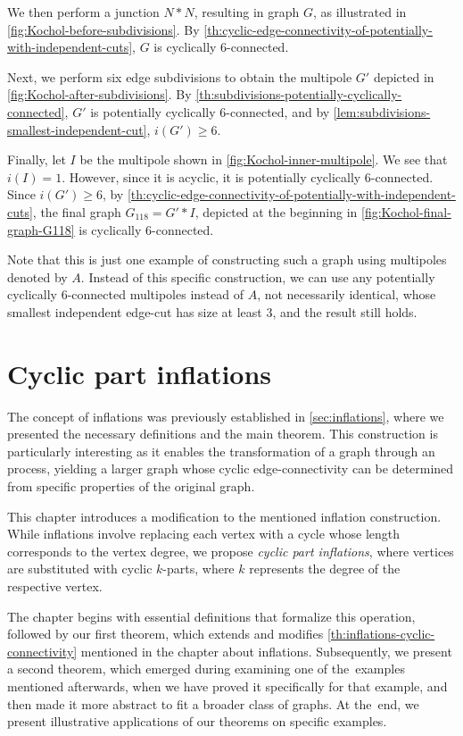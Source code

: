 \documentclass[12pt, twoside]{book}
\begin{document}
\begin{example}
	We then perform a junction $N*N$, resulting in graph $G$, as illustrated in \cref{fig:Kochol-before-subdivisions}. By \cref{th:cyclic-edge-connectivity-of-potentially-with-independent-cuts}, $G$ is cyclically 6-connected.
	
	Next, we perform six edge subdivisions to obtain the multipole $G'$ depicted in \cref{fig:Kochol-after-subdivisions}. By \cref{th:subdivisions-potentially-cyclically-connected}, $G'$ is potentially cyclically 6-connected, and by \cref{lem:subdivisions-smallest-independent-cut}, $i(G')\geq 6$.
	
	Finally, let $I$ be the multipole shown in \cref{fig:Kochol-inner-multipole}. We see that $i(I)=1$. However, since it is acyclic, it is potentially cyclically 6-connected. Since $i(G')\geq 6$, by \cref{th:cyclic-edge-connectivity-of-potentially-with-independent-cuts}, the final graph $G_{118}=G'*I$, depicted at the beginning in \cref{fig:Kochol-final-graph-G118} is cyclically 6-connected.
	
	Note that this is just one example of constructing such a graph using multipoles denoted by $A$. Instead of this specific construction, we can use any potentially cyclically 6-connected multipoles instead of $A$, not necessarily identical, whose smallest independent edge-cut has size at least 3, and the result still holds.
\end{example}

\chapter{Cyclic part inflations}\label{ch:cyclic-part-inflations}

The concept of inflations was previously established in \cref{sec:inflations}, where we presented the necessary definitions and the main theorem. This construction is particularly interesting as it enables the transformation of a graph through an  process, yielding a larger graph whose cyclic edge-connectivity can be determined from specific properties of the original graph.

This chapter introduces a modification to the mentioned inflation construction. While inflations involve replacing each vertex with a cycle whose length corresponds to the vertex degree, we propose \textit{cyclic part inflations}, where vertices are substituted with cyclic $k$-parts, where $k$ represents the degree of the respective vertex.

The chapter begins with essential definitions that formalize this operation, followed by our first theorem, which extends and modifies \cref{th:inflations-cyclic-connectivity} mentioned in the chapter about inflations. Subsequently, we present a second theorem, which emerged during examining one of the~examples mentioned afterwards, when we have proved it specifically for that example, and then made it more abstract to fit a broader class of graphs. At the~end, we present illustrative applications of our theorems on specific examples.
\end{document}
